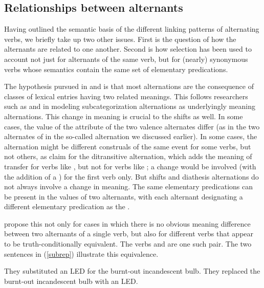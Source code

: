\documentclass[output=paper
 	        ,biblatex
                ,babelshorthands
                ,newtxmath
                ,draftmode
                ,colorlinks, citecolor=brown
]{langscibook}
\begin{document}
\subsection{Relationships between alternants}

Having outlined the semantic basis of the different linking patterns of alternating verbs, we briefly take up two other issues.
First is the question of how the alternants are related to one another.
Second is how  selection has been used to account not just for alternants of the same verb, but for (nearly) synonymous verbs whose semantics contain the same set of elementary predications.

The hypothesis pursued in \citet{Davis1996} and \citet{Davis2001}  is that 
most alternations are the consequence of classes of lexical entries having
two related meanings. This follows researchers such as \citet{Pinker1989} and \citet{Levin1993} in modeling subcategorization alternations as underlyingly meaning alternations. 
This change in meaning is crucial to the \citet{KoenigandDavis2006}  shifts as well. In some cases, the value of the \rels attribute of the two valence alternates differ (as in the two alternates of  in the so-called  alternation we discussed earlier).
In some cases, the alternation might be different construals of the same event for some verbs, but not others, as \citet{RappaportandLevin2008} claim for the  ditransitive alternation, which adds the meaning of transfer for verbs like , but not for verbs like ; a  change would be involved (with the addition of a ) for the first verb only. But  shifts and diathesis alternations do not always involve a change in meaning. The same elementary predications can be present in the  values of two alternants, with each alternant designating a different elementary predication as the .

\citeauthor{KoenigandDavis2006} propose this not only for cases in which there is no obvious meaning difference between two alternants of a single verb, but also for different verbs that appear to be truth-conditionally equivalent.
The verbs  and  are one such pair.
The two sentences in (\ref{subrep}) illustrate this equivalence.

\begin{exe}
\ex\label{subrep}
\begin{xlist}
\ex\label{subrepa}They substituted an LED for the burnt-out incandescent bulb.
\ex\label{subrepb}They replaced the burnt-out incandescent bulb with an LED.
\end{xlist}
\end{exe}
\end{document}
